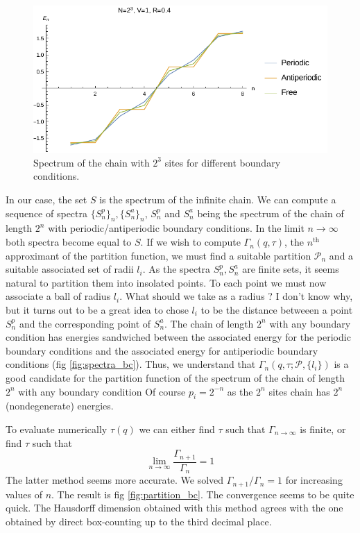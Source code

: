 \documentclass[11pt]{article}
\begin{document}
\begin{figure}[htp]
\centering
  \includegraphics[width=.8\linewidth]{data/spectra_vs_bc_hchain.pdf}
  \caption{Spectrum of the chain with $2^3$ sites for different boundary conditions.}
  \label{fig:spectra_bc}
\end{figure}

In our case, the set $S$ is the spectrum of the infinite chain. 
We can compute a sequence of spectra $\{S^p_n\}_n, \{S^a_n\}_n$, $S^p_n$ and $S^a_n$ being the spectrum of the chain of length $2^n$ with periodic/antiperiodic boundary conditions. In the limit $n\rightarrow \infty$ both spectra become equal to $S$.
If we wish to compute $\Gamma_n(q,\tau)$, the $n^\text{th}$ approximant of the partition function, we must find a suitable partition $\mathcal{P}_n$ and a suitable associated set of radii $l_i$.
As the spectra $S^p_n, S^a_n$ are finite sets, it seems natural to partition them into insolated points. To each point we must now associate a ball of radius $l_i$. What should we take as a radius ? I don't know why, but it turns out to be a great idea to chose $l_i$ to be the distance betweeen a point $S^p_n$ and the corresponding point of $S^a_n$. 
The chain of length $2^n$ with any boundary condition has energies sandwiched between the associated energy for the periodic boundary conditions and the associated energy for antiperiodic boundary conditions (fig \eqref{fig:spectra_bc}). Thus, we understand that $\Gamma_n(q,\tau;\mathcal{P},\{l_i\})$ is a good candidate for the partition function of the spectrum of the chain of length $2^n$ with any boundary condition
Of course $p_i = 2^{-n}$ as the $2^n$ sites chain has $2^n$ (nondegenerate) energies.

To evaluate numerically $\tau(q)$ we can either find $\tau$ such that $\Gamma_{n\rightarrow \infty}$ is finite, or find $\tau$ such that 
\begin{equation}
	\lim_{n\rightarrow \infty} \frac{\Gamma_{n+1}}{\Gamma_n} = 1
\end{equation}
The latter method seems more accurate. We solved $\Gamma_{n+1}/\Gamma_n = 1$ for increasing values of $n$. The result is fig \eqref{fig:partition_bc}. The convergence seems to be quite quick. 
The Hausdorff dimension obtained with this method agrees with the one obtained by direct box-counting up to the third decimal place.
\end{document}
